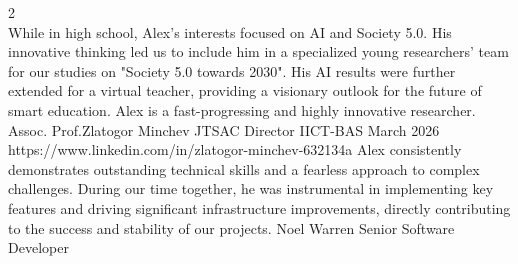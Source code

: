 \documentclass[pastel]{simplehipstercv}
\begin{document}
\begin{paracol}{2}
{%
\newpage
{} \\
\vspace{-0.15cm}
\setlength{\epigraphwidth}{\linewidth}
\cvreference
    {While in high school, Alex's interests focused on AI and Society 5.0. His innovative thinking led us to include him in a specialized young researchers' team for our studies on "Society 5.0 towards 2030". His AI results were further extended for a virtual teacher, providing a visionary outlook for the future of smart education. Alex is a fast-progressing and highly innovative researcher.}
    {Assoc. Prof.}{Zlatogor Minchev}
    {JTSAC Director}
    {IICT-BAS}
    {March 2026}
    {https://www.linkedin.com/in/zlatogor-minchev-632134a}
\cvhline
\cvreference
    {Alex consistently demonstrates outstanding technical skills and a fearless approach to complex challenges. During our time together, he was instrumental in implementing key features and driving significant infrastructure improvements, directly contributing to the success and stability of our projects.}
    {}{Noel Warren}
    {Senior Software Developer}
}
\end{paracol}
\end{document}
